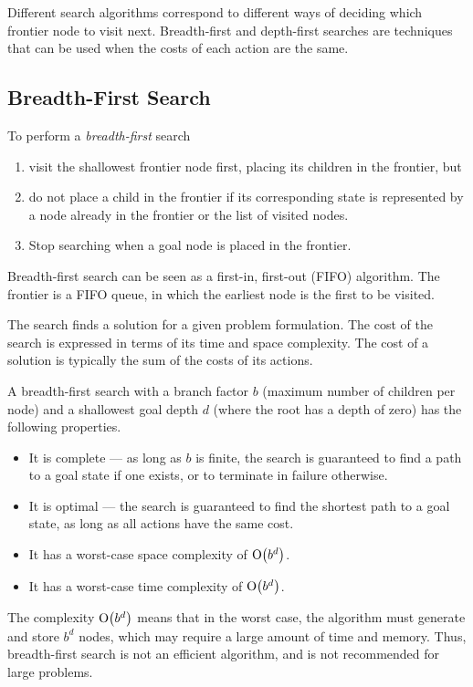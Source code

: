 Different search algorithms correspond to different ways of deciding which frontier node to visit next.
Breadth-first and depth-first searches are techniques that can be used when the costs of each action are the same.

\subsection{Breadth-First Search}

To perform a \emph{breadth-first} search
\begin{enumerate}
  \item visit the shallowest frontier node first, placing its children in the frontier, but
  \item do not place a child in the frontier if its corresponding state is represented by a node already in the frontier or the list of visited nodes.
  \item Stop searching when a goal node is placed in the frontier.
\end{enumerate}

Breadth-first search can be seen as a first-in, first-out (FIFO) algorithm.
The frontier is a FIFO queue, in which the earliest node is the first to be visited.

The search finds a solution for a given problem formulation.
The cost of the search is expressed in terms of its time and space complexity.
The cost of a solution is typically the sum of the costs of its actions.

A breadth-first search with a branch factor \( b \) (maximum number of children per node) and a shallowest goal depth \( d \) (where the root has a depth of zero) has the following properties.
\begin{itemize}
  \item It is complete --- as long as \( b \) is finite, the search is guaranteed to find a path to a goal state if one exists, or to terminate in failure otherwise.
  \item It is optimal --- the search is guaranteed to find the shortest path to a goal state, as long as all actions have the same cost.
  \item It has a worst-case space complexity of \( \mathrm{O}\!\left( b^{d} \right) \).
  \item It has a worst-case time complexity of \( \mathrm{O}\!\left( b^{d} \right) \).
\end{itemize}

The complexity \( \mathrm{O}\!\left( b^{d} \right) \) means that in the worst case, the algorithm must generate and store \( b^{d} \) nodes, which may require a large amount of time and memory.
Thus, breadth-first search is not an efficient algorithm, and is not recommended for large problems.

